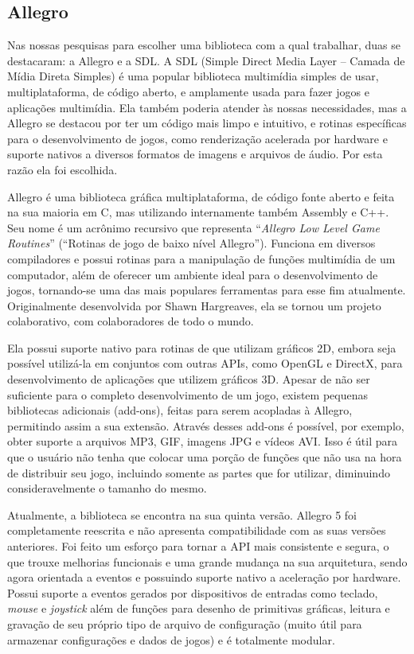 \subsection{Allegro}
\label{allegro}
%
Nas nossas pesquisas para escolher uma biblioteca com a qual trabalhar, duas se destacaram: a Allegro e a SDL. A SDL (Simple Direct Media Layer -- Camada de Mídia Direta Simples) é uma popular biblioteca multimídia simples de usar, multiplataforma, de código aberto, e amplamente usada para fazer  jogos e aplicações multimídia. Ela também poderia atender às nossas necessidades, mas a Allegro se destacou por ter um código mais limpo e intuitivo, e rotinas específicas para o desenvolvimento de jogos, como renderização acelerada por hardware e suporte nativos a diversos formatos de imagens e arquivos de áudio. Por esta razão ela foi escolhida.
\par 
Allegro \cite{AllegroDoc} é uma biblioteca gráfica multiplataforma, de código fonte aberto e feita na sua maioria em C, mas utilizando internamente também Assembly e C++. Seu nome é um acrônimo recursivo que representa ``\textit{Allegro Low Level Game Routines}'' (``Rotinas de jogo de baixo nível Allegro''). Funciona em diversos compiladores e possui rotinas para a manipulação de funções multimídia de um computador, além de oferecer um ambiente ideal para o desenvolvimento de jogos, tornando-se uma das mais populares ferramentas para esse fim atualmente. Originalmente desenvolvida por Shawn Hargreaves, ela se tornou um projeto colaborativo, com colaboradores de todo o mundo.
\par
Ela possui suporte nativo para rotinas de que utilizam gráficos 2D, embora seja possível utilizá-la em conjuntos com outras APIs, como OpenGL e DirectX, para desenvolvimento de aplicações que utilizem gráficos 3D. Apesar de não ser suficiente para o completo desenvolvimento de um jogo, existem pequenas bibliotecas adicionais (add-ons), feitas para serem acopladas à Allegro, permitindo assim a sua extensão. Através desses add-ons é possível, por exemplo, obter suporte a arquivos MP3, GIF, imagens JPG e vídeos AVI. Isso é útil para que o usuário não tenha que colocar uma porção de funções que não usa na hora de distribuir seu jogo, incluindo somente as partes que for utilizar, diminuindo consideravelmente o tamanho do mesmo.
\par
Atualmente, a biblioteca se encontra na sua quinta versão. Allegro 5 foi completamente reescrita e não apresenta compatibilidade com as suas versões anteriores. Foi feito um esforço para tornar a API mais consistente e segura, o que trouxe melhorias funcionais e uma grande mudança na sua arquitetura, sendo agora orientada a eventos e possuindo suporte nativo a aceleração por hardware. Possui suporte a eventos gerados por dispositivos de entradas como teclado, \textit{mouse} e \textit{joystick} além de funções para desenho de primitivas gráficas, leitura e gravação de seu próprio tipo de arquivo de configuração (muito útil para armazenar configurações e dados de jogos) e é totalmente modular.
